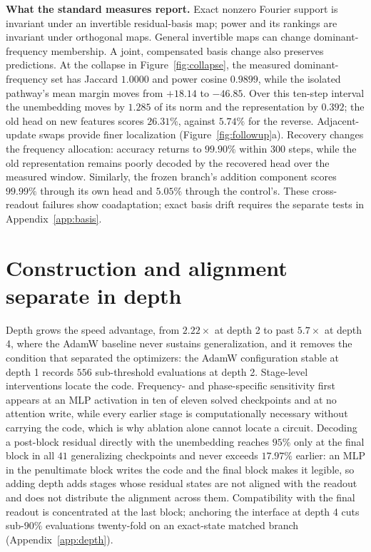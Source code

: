 \documentclass{article}
\begin{document}
\textbf{What the standard measures report.} Exact nonzero Fourier support is invariant under an invertible residual-basis map; power and its rankings are invariant under orthogonal maps. General invertible maps can change dominant-frequency membership. A joint, compensated basis change also preserves predictions. At the collapse in Figure~\ref{fig:collapse}, the measured dominant-frequency set has Jaccard $1.0000$ and power cosine $0.9899$, while the isolated pathway's mean margin moves from $+18.14$ to $-46.85$. Over this ten-step interval the unembedding moves by $1.285$ of its norm and the representation by $0.392$; the old head on new features scores $26.31\%$, against $5.74\%$ for the reverse. Adjacent-update swaps provide finer localization (Figure~\ref{fig:followup}a). Recovery changes the frequency allocation: accuracy returns to $99.90\%$ within $300$ steps, while the old representation remains poorly decoded by the recovered head over the measured window. Similarly, the frozen branch's addition component scores $99.99\%$ through its own head and $5.05\%$ through the control's. These cross-readout failures show coadaptation; exact basis drift requires the separate tests in Appendix~\ref{app:basis}.

\section{Construction and alignment separate in depth}
\label{sec:depth}

Depth grows the speed advantage, from $2.22\times$ at depth 2 to past $5.7\times$ at depth 4, where the AdamW baseline never sustains generalization, and it removes the condition that separated the optimizers: the AdamW configuration stable at depth 1 records $556$ sub-threshold evaluations at depth 2. Stage-level interventions locate the code. Frequency- and phase-specific sensitivity first appears at an MLP activation in ten of eleven solved checkpoints and at no attention write, while every earlier stage is computationally necessary without carrying the code, which is why ablation alone cannot locate a circuit. Decoding a post-block residual directly with the unembedding reaches $95\%$ only at the final block in all $41$ generalizing checkpoints and never exceeds $17.97\%$ earlier: an MLP in the penultimate block writes the code and the final block makes it legible, so adding depth adds stages whose residual states are not aligned with the readout and does not distribute the alignment across them. Compatibility with the final readout is concentrated at the last block; anchoring the interface at depth 4 cuts sub-$90\%$ evaluations twenty-fold on an exact-state matched branch (Appendix~\ref{app:depth}).
\end{document}
